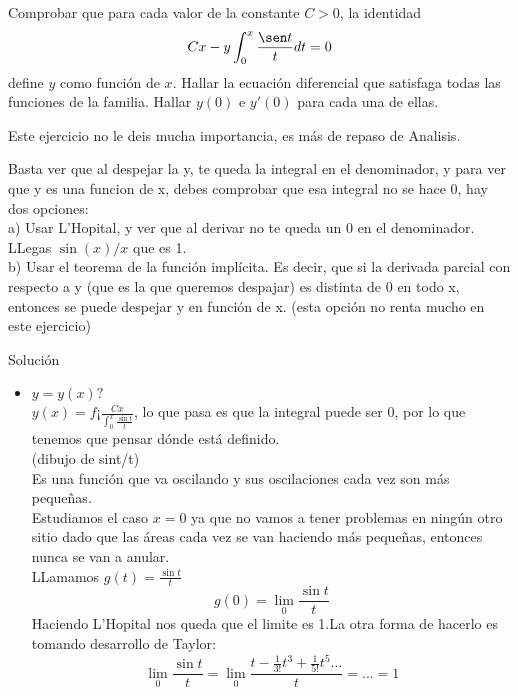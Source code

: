 \documentclass[nochap]{apuntes}
\begin{document}
\begin{problem}[3]
Comprobar que para cada valor de la constante $C>0$, la identidad
\begin{gather*}
Cx-y \int_0^x\frac{\sen t}{t}dt=0
\end{gather*}
define $y$ como función de $x$. Hallar la ecuación diferencial que satisfaga todas las funciones de la familia. Hallar $y(0)$ e $y'(0)$ para cada una de ellas.

\solution

\begin{expla}
Este ejercicio no le deis mucha importancia, es más de repaso de Analisis.

Basta ver que al despejar la y, te queda la integral en el denominador, y para ver que y es una funcion de x, debes comprobar que esa integral no se hace 0, hay dos opciones:\\
a) Usar L'Hopital, y ver que al derivar no te queda un 0 en el denominador. LLegas $\sin (x)/x$ que es 1.\\
b) Usar el teorema de la función implícita. Es decir, que si la derivada parcial con respecto a y (que es la que queremos despajar) es distinta de 0 en todo x, entonces se puede despejar y en función de x. (esta opción no renta mucho en este ejercicio)
\end{expla}

Solución\\
\begin{itemize}
\item $y = y(x)?$\\
$y(x) = f¡\frac{Cx}{\int_0^x \frac{\sin t}{t}}$, lo que pasa es que la integral puede ser 0, por lo que tenemos que pensar dónde está definido.\\
(dibujo de sint/t)\\
Es una función que va oscilando y sus oscilaciones cada vez son más pequeñas.\\
Estudiamos el caso $x=0$ ya que no vamos a tener problemas en ningún otro sitio dado que las áreas cada vez se van haciendo más pequeñas, entonces nunca se van a anular.\\
LLamamos $g(t) = \frac{\sin t}{t}$\\
$$g(0) = \lim\limits_{0} \frac{\sin t}{t} $$
Haciendo L'Hopital nos queda que el limite es 1.La otra forma de hacerlo es tomando desarrollo de Taylor:\\
$$\lim\limits_{0} \frac{\sin t}{t} = \lim\limits_{0} \frac{t - \frac{1}{3!}t^3 +  \frac{1}{5!}t^5 ...}{t} = ... = 1$$


\end{itemize}
\end{problem}
\end{document}
